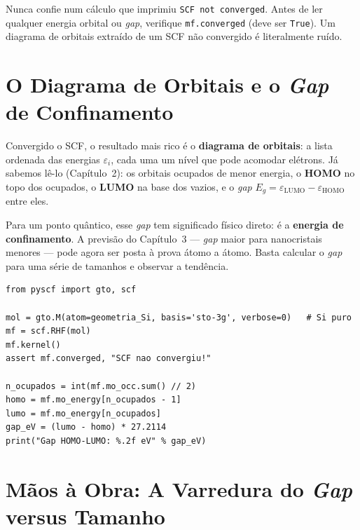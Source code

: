 \documentclass[11pt,a4paper,openany]{book}
\newcommand{\code}[1]{\texttt{#1}}
\begin{document}
\begin{caixaatencao}
Nunca confie num cálculo que imprimiu \code{SCF not converged}. Antes de ler
qualquer energia orbital ou \emph{gap}, verifique \code{mf.converged} (deve ser
\code{True}). Um diagrama de orbitais extraído de um SCF não convergido é
literalmente ruído.
\end{caixaatencao}

\section{O Diagrama de Orbitais e o \emph{Gap} de Confinamento}
\label{sec:diagrama}

Convergido o SCF, o resultado mais rico é o \textbf{diagrama de orbitais}: a lista
ordenada das energias $\varepsilon_i$, cada uma um nível que pode acomodar
elétrons. Já sabemos lê-lo (Capítulo~2): os orbitais ocupados de menor energia,
o \textbf{HOMO} no topo dos ocupados, o \textbf{LUMO} na base dos vazios, e o
\emph{gap} $E_g = \varepsilon_{\text{LUMO}} - \varepsilon_{\text{HOMO}}$ entre
eles.

Para um ponto quântico, esse \emph{gap} tem significado físico direto: é a
\textbf{energia de confinamento}. A previsão do Capítulo~3 --- \emph{gap} maior
para nanocristais menores --- pode agora ser posta à prova átomo a átomo. Basta
calcular o \emph{gap} para uma série de tamanhos e observar a tendência.

\begin{lstlisting}[style=python,caption={Extraindo o \emph{gap} de um nanocristal.},label={lst:gapextrai}]
from pyscf import gto, scf

mol = gto.M(atom=geometria_Si, basis='sto-3g', verbose=0)   # Si puro
mf = scf.RHF(mol)
mf.kernel()
assert mf.converged, "SCF nao convergiu!"

n_ocupados = int(mf.mo_occ.sum() // 2)
homo = mf.mo_energy[n_ocupados - 1]
lumo = mf.mo_energy[n_ocupados]
gap_eV = (lumo - homo) * 27.2114
print("Gap HOMO-LUMO: %.2f eV" % gap_eV)
\end{lstlisting}

\section{Mãos à Obra: A Varredura do \emph{Gap} versus Tamanho}
\label{sec:maos4}
\end{document}

